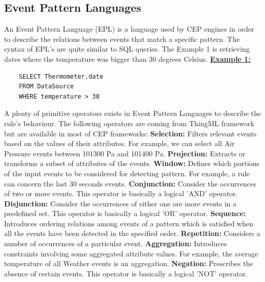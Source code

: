 \documentclass[11pt]{article}
\begin{document}
\subsection{Event Pattern Languages}

An Event Pattern Language (EPL) is a language used by CEP engines in order to describe the relations between events that match a specific pattern. The syntax of EPL's are quite similar to SQL queries. The Example 1 is retrieving dates where the temperature was bigger than 30 degrees Celsius.
\newline
\newline
\underline{\textbf{Example 1:}}
\begin{verbatim}
	SELECT Thermometer.date
	FROM DataSource
	WHERE temperature > 30
\end{verbatim}
A plenty of primitive operators exists in Event Pattern Languages to describe the rule's behaviour. The following operators are coming from ThingML framework but are available in most of CEP frameworks:
\newline
\newline
\textbf{Selection:} Filters relevant events based on the values of their attributes.\cite{6} For example, we can select all Air Pressure events between 101300 Pa and 101400 Pa.
\newline
\textbf{Projection:} Extracts or transforms a subset of attributes of the events.\cite{6}
\newline
\textbf{Window:} Defines which portions of the input events to be considered for detecting pattern.\cite{6} For example, a rule can concern the last 30 seconds events.
\newline
\textbf{Conjunction:} Consider the occurrences of two or more events.\cite{6} This operator is basically a logical 'AND' operator.
\newline
\textbf{Disjunction:} Consider the occurrences of either one ore more events in a predefined set.\cite{6} This operator is basically a logical 'OR' operator.
\newline
\textbf{Sequence:} Introduces ordering relations among events of a pattern which is satisfied when all the events have been detected in the specified order.\cite{6}
\newline
\textbf{Repetition:} Considers a number of occurrences of a particular event.\cite{6}
\newline
\textbf{Aggregation:} Introduces constraints involving some aggregated attribute values.\cite{6} For example, the average temperature of all Weather events is an aggregation.
\newline
\textbf{Negation:} Prescribes the absence of certain events.\cite{6} This operator is basically a logical 'NOT' operator.
\end{document}
